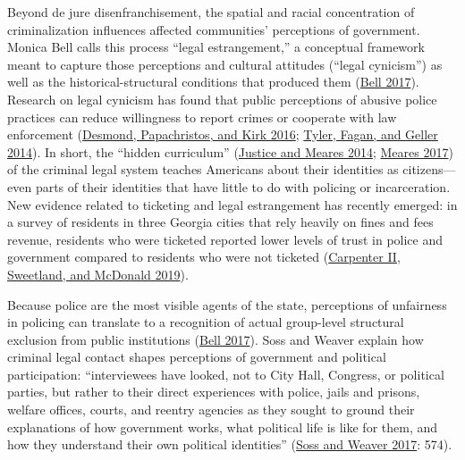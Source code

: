 \documentclass[
  12pt,
]{article}
\begin{document}
Beyond de jure disenfranchisement, the spatial and racial concentration of criminalization influences affected communities' perceptions of government. Monica Bell calls this process ``legal estrangement,'' a conceptual framework meant to capture those perceptions and cultural attitudes (``legal cynicism'') as well as the historical-structural conditions that produced them (\protect\hyperlink{ref-Bell2017}{Bell 2017}). Research on legal cynicism has found that public perceptions of abusive police practices can reduce willingness to report crimes or cooperate with law enforcement (\protect\hyperlink{ref-Desmond2016}{Desmond, Papachristos, and Kirk 2016}; \protect\hyperlink{ref-Tyler2014}{Tyler, Fagan, and Geller 2014}). In short, the ``hidden curriculum'' (\protect\hyperlink{ref-Justice2014}{Justice and Meares 2014}; \protect\hyperlink{ref-Meares2017}{Meares 2017}) of the criminal legal system teaches Americans about their identities as citizens---even parts of their identities that have little to do with policing or incarceration. New evidence related to ticketing and legal estrangement has recently emerged: in a survey of residents in three Georgia cities that rely heavily on fines and fees revenue, residents who were ticketed reported lower levels of trust in police and government compared to residents who were not ticketed (\protect\hyperlink{ref-CarpenterII2019}{Carpenter II, Sweetland, and McDonald 2019}).

Because police are the most visible agents of the state, perceptions of unfairness in policing can translate to a recognition of actual group-level structural exclusion from public institutions (\protect\hyperlink{ref-Bell2017}{Bell 2017}). Soss and Weaver explain how criminal legal contact shapes perceptions of government and political participation: ``interviewees have looked, not to City Hall, Congress, or political parties, but rather to their direct experiences with police, jails and prisons, welfare offices, courts, and reentry agencies as they sought to ground their explanations of how government works, what political life is like for them, and how they understand their own political identities'' (\protect\hyperlink{ref-Soss2017}{Soss and Weaver 2017}: 574).
\end{document}
